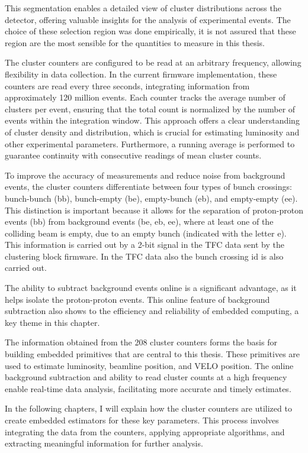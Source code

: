 This segmentation enables a detailed view of cluster distributions across the detector, offering valuable insights for the analysis of experimental events. The choice of these selection region was done empirically, it is not assured that these region are the most sensible for the quantities to measure in this thesis. 

The cluster counters are configured to be read at an arbitrary frequency, allowing flexibility in data collection. In the current firmware implementation, these counters are read every three seconds, integrating information from approximately 120 million events. 
Each counter tracks the average number of clusters per event, ensuring that the total count is normalized by the number of events within the integration window. This approach offers a clear understanding of cluster density and distribution, which is crucial for estimating luminosity and other experimental parameters. Furthermore, a running average is performed to guarantee continuity with consecutive readings of mean cluster counts.

To improve the accuracy of measurements and reduce noise from background events, the cluster counters differentiate between four types of bunch crossings: bunch-bunch (bb), bunch-empty (be), empty-bunch (eb), and empty-empty (ee). This distinction is important because it allows for the separation of proton-proton events (bb) from background events (be, eb, ee), where at least one of the colliding beam is empty, due to an empty bunch (indicated with the letter e). This information is carried out by a 2-bit signal in the TFC data sent by the clustering block firmware. In the TFC data also the bunch crossing id is also carried out.

The ability to subtract background events online is a significant advantage, as it helps isolate the proton-proton events. This online feature of background subtraction also shows to the efficiency and reliability of embedded computing, a key theme in this chapter.

The information obtained from the 208 cluster counters forms the basis for building embedded primitives that are central to this thesis. These primitives are used to estimate luminosity, beamline position, and VELO position. The online background subtraction and ability to read cluster counts at a high frequency enable real-time data analysis, facilitating more accurate and timely estimates.

In the following chapters, I will explain how the cluster counters are utilized to create embedded estimators for these key parameters. This process involves integrating the data from the counters, applying appropriate algorithms, and extracting meaningful information for further analysis. 